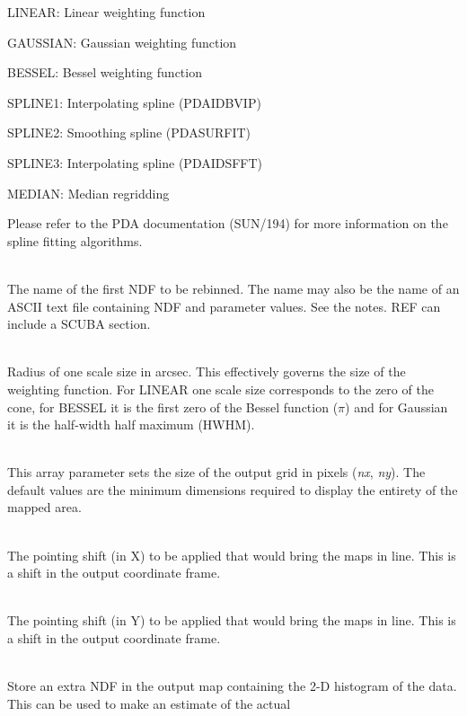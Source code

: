 \documentclass[twoside,11pt]{article}
\newcommand{\htmlref}[2]{#1}
\newcommand{\xref}[3]{#1}
\renewcommand{\_}{\texttt{\symbol{95}}}
\newcommand{\sstsubsection}[1]{ \item[{#1}] \mbox{} \\}
\newcommand{\sstitem}{\item}
\newcommand{\sstsubsection}[1]{\item[{#1}]}
\newcommand{\sstitem}{\item}
\begin{document}
{{{{            \sstitem
            LINEAR:  Linear weighting function

            \sstitem
            GAUSSIAN: Gaussian weighting function


            \sstitem
            BESSEL:  Bessel weighting function

            \sstitem
            SPLINE1: Interpolating spline 
                (\xref{PDA\_IDBVIP}{sun194}{PDA_IDBVIP})

            \sstitem
            SPLINE2: Smoothing spline 
                (\xref{PDA\_SURFIT}{sun194}{PDA_SURFIT})

            \sstitem
            SPLINE3: Interpolating spline 
                (\xref{PDA\_IDSFFT}{sun194}{PDA_IDSFFT})

            \sstitem
            MEDIAN: Median regridding
         }
         Please refer to the PDA documentation 
         (\xref{SUN/194}{sun194}{}) for more information
         on the spline fitting algorithms.
      }
      \sstsubsection{
         REF = CHAR (Read)
      }{
         The name of the first NDF to be rebinned. The name may also be the
         name of an ASCII text file containing NDF and parameter values.
         See the notes. REF can include a \htmlref{SCUBA section}{sections}.
      }
      \sstsubsection{
         SCALE = REAL (Read)
      }{
         Radius of one scale size in arcsec. This effectively governs the
         size of the weighting function. For LINEAR one scale size corresponds
         to the zero of the cone, for BESSEL it is the first zero of the
         Bessel function ($\pi$) and for Gaussian it is the half-width
         half maximum (HWHM).
      }
      \sstsubsection{
         SIZE ( 2 ) = INTEGER (Read)
      }{
         This array parameter sets the size of the output grid in pixels
         (\textit{nx}, \textit{ny}). The default values are the minimum
         dimensions required to display the entirety of the mapped area.
      }
      \sstsubsection{
         SHIFT\_DX = REAL (Read)
      }{
         The pointing shift (in X) to be applied that would bring the
         maps in line. This is a shift in the output coordinate frame.
      }
      \sstsubsection{
         SHIFT\_DY = REAL (Read)
      }{
         The pointing shift (in Y) to be applied that would bring the
         maps in line. This is a shift in the output coordinate frame.
      }
      \sstsubsection{
         TIMES = LOGICAL (Read)
      }{
         Store an extra NDF in the output map containing the 2-D histogram
         of the data. This can be used to make an estimate of the actual
}}}
\end{document}
